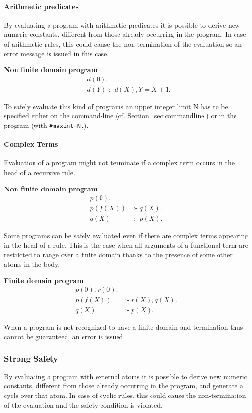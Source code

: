 \documentclass[a4paper, titlepage]{article}
\DeclareMathOperator{\leftimpl}{:-}
\begin{document}
\paragraph{Arithmetic predicates}
By evaluating a program with arithmetic predicates it is possible to derive new numeric constants, different from those already occurring in the program. In case of arithmetic rules, this could cause the non-termination of the evaluation so an error message is issued in this case.
\begin{exmp} \textbf{Non finite domain program}
\begin{align*}
& d(0). \\
& d(Y) \leftimpl d(X), Y=X+1.
\end{align*}
\end{exmp}
To safely evaluate this kind of programs an upper integer limit N has to be specified either on the command-line (cf. Section~\ref{sec:commandline}) or in the program (with \texttt{\#maxint=N.}).


\paragraph{Complex Terms}
Evaluation of a program might not terminate if a complex term occurs in the head of a recursive rule.
\begin{exmp} \textbf{Non finite domain program}
\begin{align*}
p(0).&\\
p(f(X)) & \leftimpl q(X).\\
q(X) & \leftimpl p(X).
\end{align*}
\end{exmp}
Some programs can be safely evaluated even if there are complex terms appearing in the head of a rule. This is the case when all arguments of a functional term are restricted to range over a finite domain thanks to the presence of some other atoms in the body.
\begin{exmp} \textbf{Finite domain program}
\begin{align*}
p(0). \ r(0). \\
p(f(X)) & \leftimpl r(X), q(X). \\
q(X) & \leftimpl p(X).
\end{align*}
\end{exmp}
When a program is not recognized to have a finite domain and termination thus cannot be guaranteed, an error is issued. 

\subsubsection{Strong Safety}
By evaluating a program with external atoms it is possible to derive new numeric constants, different from those already occurring in the program, and generate a cycle over that atom. In case of cyclic rules, this could cause the non-termination of the evaluation and the safety condition is violated.
\end{document}
